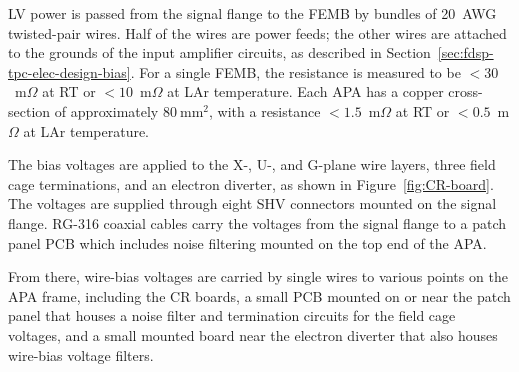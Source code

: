 LV power is passed from the signal flange to the FEMB by bundles of
20~AWG twisted-pair wires. Half of the wires are power feeds; the other wires
are attached to the grounds of the input amplifier circuits, as described in Section~\ref{sec:fdsp-tpc-elec-design-bias}.
For a single FEMB, the resistance is measured to be $<30$~m$\Omega$ at RT or $<10$~m$\Omega$ at 
LAr temperature. Each APA has a copper cross-section of approximately $80~\mathrm{mm}^2$, with a 
resistance $<1.5$~m$\Omega$ at RT or $<0.5$~m$\Omega$ at LAr temperature.

The bias voltages are applied to the X-, U-, and G-plane wire layers, three field cage terminations, 
and an electron diverter, as shown in Figure~\ref{fig:CR-board}. The voltages are supplied 
through eight SHV connectors mounted on the signal flange. RG-316 coaxial cables carry the voltages 
from the signal flange to a patch panel PCB which includes noise filtering mounted on the top 
end of the APA. 

From there, wire-bias voltages are carried by single wires to 
various points on the APA frame, including the CR boards, a small PCB mounted on or near 
the patch panel that houses a noise filter and termination circuits for the field cage voltages, and 
a small mounted board near the electron diverter that also houses wire-bias voltage filters.
